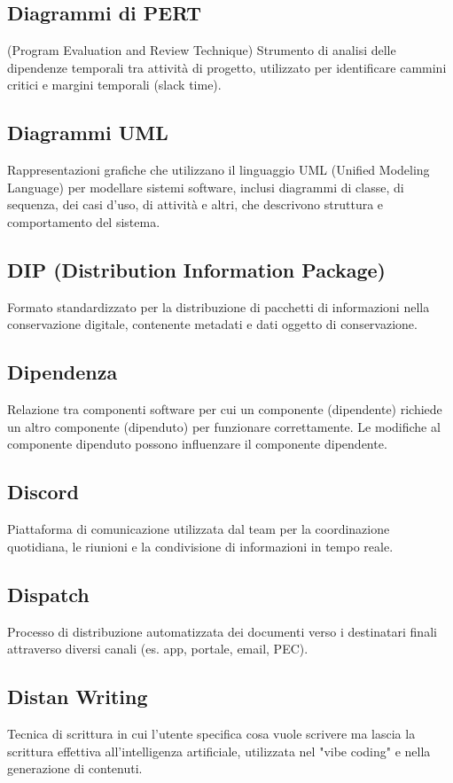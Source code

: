 \documentclass[a4paper,11pt]{article}
\begin{document}
\subsection{Diagrammi di PERT}
(Program Evaluation and Review Technique) Strumento di analisi delle dipendenze temporali tra attività di progetto, utilizzato per identificare cammini critici e margini temporali (slack time).

\subsection{Diagrammi UML}
Rappresentazioni grafiche che utilizzano il linguaggio UML (Unified Modeling Language) per modellare sistemi software, inclusi diagrammi di classe, di sequenza, dei casi d'uso, di attività e altri, che descrivono struttura e comportamento del sistema.

\subsection{DIP (Distribution Information Package)}
Formato standardizzato per la distribuzione di pacchetti di informazioni nella conservazione digitale, contenente metadati e dati oggetto di conservazione.

\subsection{Dipendenza}
Relazione tra componenti software per cui un componente (dipendente) richiede un altro componente (dipenduto) per funzionare correttamente. Le modifiche al componente dipenduto possono influenzare il componente dipendente.

\subsection{Discord}
Piattaforma di comunicazione utilizzata dal team per la coordinazione quotidiana, le riunioni e la condivisione di informazioni in tempo reale.

\subsection{Dispatch}
Processo di distribuzione automatizzata dei documenti verso i destinatari finali attraverso diversi canali (es. app, portale, email, PEC).

\subsection{Distan Writing}
Tecnica di scrittura in cui l'utente specifica cosa vuole scrivere ma lascia la scrittura effettiva all'intelligenza artificiale, utilizzata nel "vibe coding" e nella generazione di contenuti.
\end{document}
